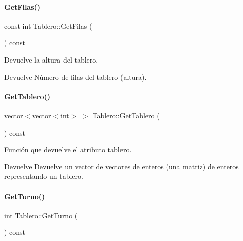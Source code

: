 \paragraph{\texorpdfstring{Get\+Filas()}{GetFilas()}}
{\footnotesize\ttfamily const int Tablero\+::\+Get\+Filas (\begin{DoxyParamCaption}{ }\end{DoxyParamCaption}) const\hspace{0.3cm}{\ttfamily [inline]}}



Devuelve la altura del tablero. 

\begin{DoxyReturn}{Devuelve}
Número de filas del tablero (altura). 
\end{DoxyReturn}
\hypertarget{classTablero_aa898aa59dd1d99df69b9f97ce51f33db}{}\label{classTablero_aa898aa59dd1d99df69b9f97ce51f33db} 
\paragraph{\texorpdfstring{Get\+Tablero()}{GetTablero()}}
{\footnotesize\ttfamily vector$<$vector$<$int$>$ $>$ Tablero\+::\+Get\+Tablero (\begin{DoxyParamCaption}{ }\end{DoxyParamCaption}) const\hspace{0.3cm}{\ttfamily [inline]}}



Función que devuelve el atributo tablero. 

\begin{DoxyReturn}{Devuelve}
Devuelve un vector de vectores de enteros (una matriz) de enteros representando un tablero. 
\end{DoxyReturn}
\hypertarget{classTablero_ac8467df724eeda4ad6b896de2abb1488}{}\label{classTablero_ac8467df724eeda4ad6b896de2abb1488} 
\paragraph{\texorpdfstring{Get\+Turno()}{GetTurno()}}
{\footnotesize\ttfamily int Tablero\+::\+Get\+Turno (\begin{DoxyParamCaption}{ }\end{DoxyParamCaption}) const\hspace{0.3cm}{\ttfamily [inline]}}



